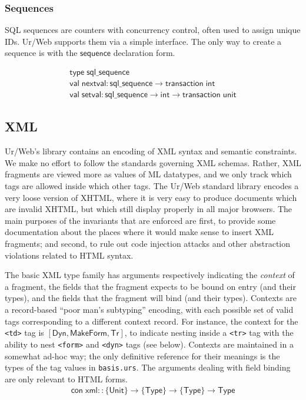 \documentclass{article}
\newcommand{\mt}[1]{\mathsf{#1}}
\begin{document}
\subsubsection{Sequences}

SQL sequences are counters with concurrency control, often used to assign unique IDs.  Ur/Web supports them via a simple interface.  The only way to create a sequence is with the $\mt{sequence}$ declaration form.

$$\begin{array}{l}
  \mt{type} \; \mt{sql\_sequence} \\
  \mt{val} \; \mt{nextval} : \mt{sql\_sequence} \to \mt{transaction} \; \mt{int} \\
  \mt{val} \; \mt{setval} : \mt{sql\_sequence} \to \mt{int} \to \mt{transaction} \; \mt{unit}
\end{array}$$


\subsection{\label{xml}XML}

Ur/Web's library contains an encoding of XML syntax and semantic constraints.  We make no effort to follow the standards governing XML schemas.  Rather, XML fragments are viewed more as values of ML datatypes, and we only track which tags are allowed inside which other tags.  The Ur/Web standard library encodes a very loose version of XHTML, where it is very easy to produce documents which are invalid XHTML, but which still display properly in all major browsers.  The main purposes of the invariants that are enforced are first, to provide some documentation about the places where it would make sense to insert XML fragments; and second, to rule out code injection attacks and other abstraction violations related to HTML syntax.

The basic XML type family has arguments respectively indicating the \emph{context} of a fragment, the fields that the fragment expects to be bound on entry (and their types), and the fields that the fragment will bind (and their types).  Contexts are a record-based ``poor man's subtyping'' encoding, with each possible set of valid tags corresponding to a different context record.  For instance, the context for the \texttt{<td>} tag is $[\mt{Dyn}, \mt{MakeForm}, \mt{Tr}]$, to indicate nesting inside a \texttt{<tr>} tag with the ability to nest \texttt{<form>} and \texttt{<dyn>} tags (see below).  Contexts are maintained in a somewhat ad-hoc way; the only definitive reference for their meanings is the types of the tag values in \texttt{basis.urs}.  The arguments dealing with field binding are only relevant to HTML forms.
$$\begin{array}{l}
  \mt{con} \; \mt{xml} :: \{\mt{Unit}\} \to \{\mt{Type}\} \to \{\mt{Type}\} \to \mt{Type}
\end{array}$$
\end{document}
